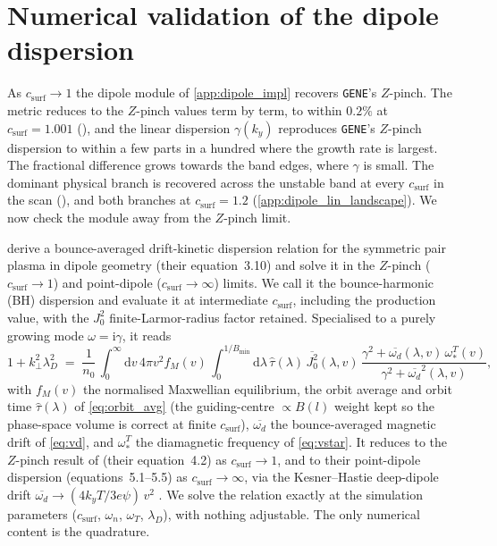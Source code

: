 \documentclass{jpp}
\newcommand{\rmd}{\text{d}}
\newcommand{\lambdaD}{\lambda_D}
\newcommand{\gene}{\texttt{GENE}}
\begin{document}
\section{Numerical validation of the dipole dispersion}\label{app:theory_compare}

As $c_\mathrm{surf}\to1$ the dipole module of \cref{app:dipole_impl} recovers \gene's $Z$-pinch. The metric reduces to the $Z$-pinch values term by term, to within $0.2\%$ at $c_\mathrm{surf}=1.001$ (), and the linear dispersion $\gamma(k_y)$ reproduces \gene's $Z$-pinch dispersion to within a few parts in a hundred where the growth rate is largest. The fractional difference grows towards the band edges, where $\gamma$ is small. The dominant physical branch is recovered across the unstable band at every $c_\mathrm{surf}$ in the scan (), and both branches at $c_\mathrm{surf} = 1.2$ (\cref{app:dipole_lin_landscape}). We now check the module away from the $Z$-pinch limit.

\citet{MPH2018} derive a bounce-averaged drift-kinetic dispersion relation for the symmetric pair plasma in dipole geometry (their equation~3.10) and solve it in the $Z$-pinch ($c_\mathrm{surf}\to1$) and point-dipole ($c_\mathrm{surf}\to\infty$) limits. We call it the bounce-harmonic (BH) dispersion and evaluate it at intermediate $c_\mathrm{surf}$, including the production value, with the $J_0^2$ finite-Larmor-radius factor retained. Specialised to a purely growing mode $\omega = \mathrm{i}\gamma$, it reads
\begin{equation}\label{eq:disp_BH}
1 + k_\perp^2 \lambdaD^2 \;=\; \frac{1}{n_0}\,\int_0^\infty\! \rmd v\,4\pi v^2 f_M(v)\,\int_0^{1/B_\mathrm{min}}\! \rmd\lambda\,\hat\tau(\lambda)\,\overline{J_0^2}(\lambda, v)\,\frac{\gamma^2 + \overline{\omega_d}(\lambda, v)\,\omega_*^T(v)}{\gamma^2 + \overline{\omega_d}^2(\lambda, v)},
\end{equation}
with $f_M(v)$ the normalised Maxwellian equilibrium, the orbit average and orbit time $\hat\tau(\lambda)$ of \cref{eq:orbit_avg} (the guiding-centre $\propto B(l)$ weight kept so the phase-space volume is correct at finite $c_\mathrm{surf}$), $\overline{\omega_d}$ the bounce-averaged magnetic drift of \cref{eq:vd}, and $\omega_*^T$ the diamagnetic frequency of \cref{eq:vstar}. It reduces to the $Z$-pinch result of \citet{MPH2018} (their equation~4.2) as $c_\mathrm{surf}\to1$, and to their point-dipole dispersion (equations~5.1--5.5) as $c_\mathrm{surf}\to\infty$, via the Kesner--Hastie deep-dipole drift $\overline{\omega_d}\to(4 k_y T/3e\psi)\,v^2$ \citep{KesnerHastie2002}. We solve the relation exactly at the simulation parameters ($c_\mathrm{surf}$, $\omega_n$, $\omega_T$, $\lambdaD$), with nothing adjustable. The only numerical content is the quadrature.
\end{document}
